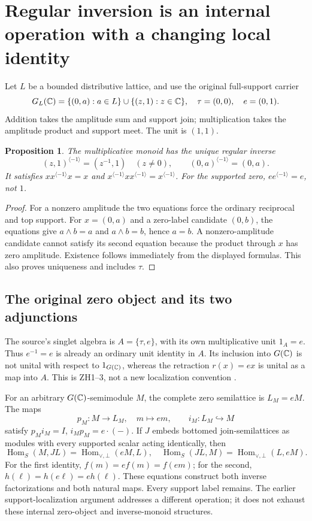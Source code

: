\documentclass[11pt,a4paper]{article}
\newtheorem{proposition}[theorem]{Proposition}
\theoremstyle{definition}
\newcommand{\rinv}[1]{#1^{\langle-1\rangle}}
\begin{document}
\section{Regular inversion is an internal operation with a changing local identity}
Let $L$ be a bounded distributive lattice, and use the original full-support carrier
\[
 G_L(\mathbb C)=\{(0,a):a\in L\}\cup\{(z,1):z\in\mathbb C\},
 \quad \tau=(0,0),\quad e=(0,1).
\]
Addition takes the amplitude sum and support join; multiplication takes the amplitude product and support meet. The unit is $(1,1)$.

\begin{proposition}\label{prop:inverse}
The multiplicative monoid has the unique regular inverse
\[
 \rinv{(z,1)}=(z^{-1},1)\quad(z\ne0),
 \qquad \rinv{(0,a)}=(0,a).
\]
It satisfies $xx^{\langle-1\rangle}x=x$ and
$x^{\langle-1\rangle}xx^{\langle-1\rangle}=x^{\langle-1\rangle}$.
For the supported zero, $e\rinv e=e$, not $1$.
\end{proposition}
\begin{proof}
For a nonzero amplitude the two equations force the ordinary reciprocal and top support. For $x=(0,a)$ and a zero-label candidate $(0,b)$, the equations give $a\wedge b=a$ and $a\wedge b=b$, hence $a=b$. A nonzero-amplitude candidate cannot satisfy its second equation because the product through $x$ has zero amplitude. Existence follows immediately from the displayed formulas. This also proves uniqueness and includes $\tau$.
\end{proof}

\subsection{The original zero object and its two adjunctions}
The source's singlet algebra is $A=\{\tau,e\}$, with its own multiplicative unit $1_A=e$. Thus $e^{-1}=e$ is already an ordinary unit identity in $A$. Its inclusion into $G(\mathbb C)$ is not unital with respect to $1_{G(\mathbb C)}$, whereas the retraction $r(x)=ex$ is unital as a map into $A$. This is ZH1--3, not a new localization convention \citep{ZH}.

For an arbitrary $G(\mathbb C)$-semimodule $M$, the complete zero semilattice is $L_M=eM$. The maps
\[
 p_M:M\longrightarrow L_M,\quad m\longmapsto em,
 \qquad i_M:L_M\hookrightarrow M
\]
satisfy $p_Mi_M=I$, $i_Mp_M=e\cdot(-)$. If $J$ embeds bottomed join-semilattices as modules with every supported scalar acting identically, then
\[
 \operatorname{Hom}_S(M,J L)=\operatorname{Hom}_{\vee,\bot}(eM,L),
 \quad
 \operatorname{Hom}_S(J L,M)=\operatorname{Hom}_{\vee,\bot}(L,eM).
\]
For the first identity, $f(m)=ef(m)=f(em)$; for the second, $h(\ell)=h(e\ell)=eh(\ell)$. These equations construct both inverse factorizations and both natural maps. Every support label remains. The earlier support-localization argument addresses a different operation; it does not exhaust these internal zero-object and inverse-monoid structures.
\end{document}
